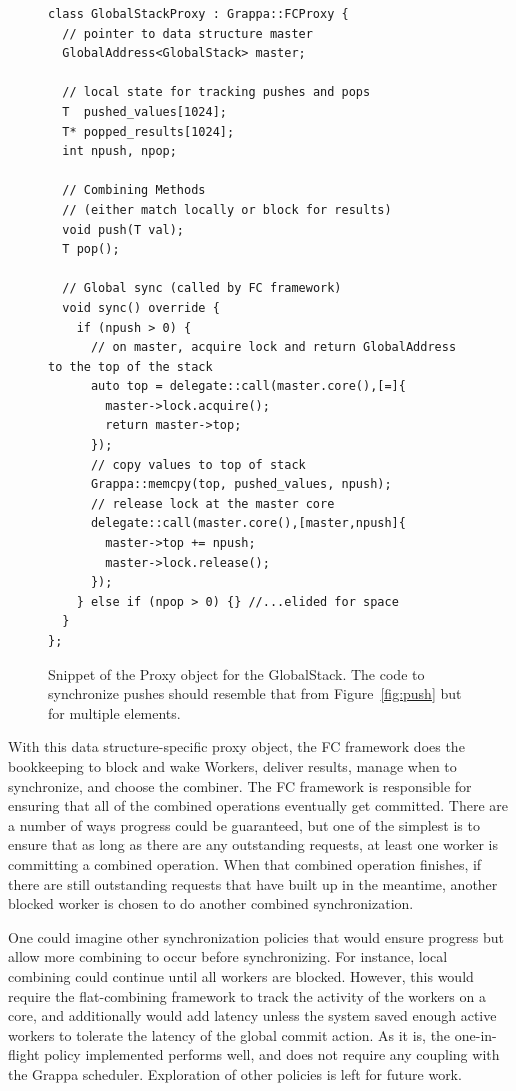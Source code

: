 \begin{figure}[t]
\centering
\begin{lstlisting}[style=grappa]
class GlobalStackProxy : Grappa::FCProxy {
  // pointer to data structure master
  GlobalAddress<GlobalStack> master;
  
  // local state for tracking pushes and pops
  T  pushed_values[1024];
  T* popped_results[1024];
  int npush, npop;

  // Combining Methods 
  // (either match locally or block for results)
  void push(T val);
  T pop();
  
  // Global sync (called by FC framework)
  void sync() override {
    if (npush > 0) {
      // on master, acquire lock and return GlobalAddress to the top of the stack
      auto top = delegate::call(master.core(),[=]{
        master->lock.acquire();
        return master->top;
      });
      // copy values to top of stack
      Grappa::memcpy(top, pushed_values, npush);
      // release lock at the master core
      delegate::call(master.core(),[master,npush]{
        master->top += npush;
        master->lock.release();
      });
    } else if (npop > 0) {} //...elided for space
  }
};
\end{lstlisting}
\caption{Snippet of the Proxy object for the GlobalStack. The code to synchronize pushes should resemble that from Figure~\ref{fig:push} but for multiple elements.}
\label{fig:proxy}
\end{figure}

With this data structure-specific proxy object, the FC framework does the bookkeeping to block and wake Workers, deliver results, manage when to synchronize, and choose the combiner.
The FC framework is responsible for ensuring that all of the combined operations eventually get committed. There are a number of ways progress could be guaranteed, but one of the simplest is to ensure that as long as there are any outstanding requests, at least one worker is committing a combined operation.
When that combined operation finishes, if there are still outstanding requests that have built up in the meantime, another blocked worker is chosen to do another combined synchronization.

One could imagine other synchronization policies that would ensure progress but allow more combining to occur before synchronizing. For instance, local combining could continue until all workers are blocked. However, this would require the flat-combining framework to track the activity of the workers on a core, and additionally would add latency unless the system saved enough active workers to tolerate the latency of the global commit action. As it is, the one-in-flight policy implemented performs well, and does not require any coupling with the Grappa scheduler. Exploration of other policies is left for future work.

